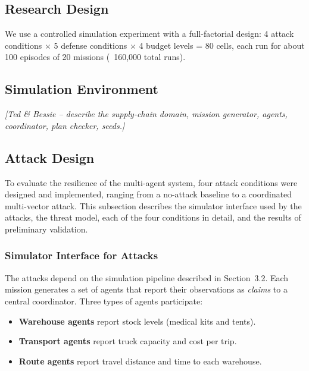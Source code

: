 \documentclass[a4paper, 11pt]{article}
\begin{document}
\subsection{Research Design}
We use a controlled simulation experiment with a full-factorial design: 4 attack conditions $\times$ 5 defense conditions $\times$ 4 budget levels = 80 cells, each run for about 100 episodes of 20 missions (~160,000 total runs).

\subsection{Simulation Environment}
\textit{[Ted \& Bessie -- describe the supply-chain domain, mission generator, agents, coordinator, plan checker, seeds.]}

\subsection{Attack Design}
\label{sec:attacks}

To evaluate the resilience of the multi-agent system, four attack conditions were designed and implemented, ranging from a no-attack baseline to a coordinated multi-vector attack. This subsection describes the simulator interface used by the attacks, the threat model, each of the four conditions in detail, and the results of preliminary validation.

\subsubsection{Simulator Interface for Attacks}

The attacks depend on the simulation pipeline described in Section~3.2. Each mission generates a set of agents that report their observations as \textit{claims} to a central coordinator. Three types of agents participate:

\begin{itemize}[nosep]
    \item \textbf{Warehouse agents} report stock levels (medical kits and tents).
    \item \textbf{Transport agents} report truck capacity and cost per trip.
    \item \textbf{Route agents} report travel distance and time to each warehouse.
\end{itemize}
\end{document}

